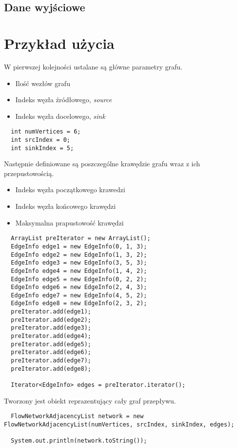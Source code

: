 \documentclass[10pt]{minutes}
\begin{document}
  \subsection{Dane wyjściowe}

\section{Przykład użycia}
W pierwszej kolejności ustalane są główne parametry grafu.
\begin{itemize}
\item Ilość wezłów grafu
\item Indeks węzła źródłowego, \emph{source}
\item Indeks węzła docelowego, \emph{sink}
\end{itemize}
\begin{lstlisting}        
  int numVertices = 6; 
  int srcIndex = 0; 
  int sinkIndex = 5;
\end{lstlisting}

Następnie definiowane są poszczególne krawędzie grafu wraz z ich przepustowością.
\begin{itemize}
\item Indeks węzła początkowego krawedzi
\item Indeks węzła końcowego krawędzi
\item Maksymalna prapustowość krawędzi
\end{itemize}
\begin{lstlisting}
  ArrayList preIterator = new ArrayList();
  EdgeInfo edge1 = new EdgeInfo(0, 1, 3);
  EdgeInfo edge2 = new EdgeInfo(1, 3, 2);
  EdgeInfo edge3 = new EdgeInfo(3, 5, 3);
  EdgeInfo edge4 = new EdgeInfo(1, 4, 2);
  EdgeInfo edge5 = new EdgeInfo(0, 2, 2);
  EdgeInfo edge6 = new EdgeInfo(2, 4, 3);
  EdgeInfo edge7 = new EdgeInfo(4, 5, 2);
  EdgeInfo edge8 = new EdgeInfo(2, 3, 2);
  preIterator.add(edge1);
  preIterator.add(edge2);
  preIterator.add(edge3);
  preIterator.add(edge4);
  preIterator.add(edge5);
  preIterator.add(edge6);
  preIterator.add(edge7);
  preIterator.add(edge8);
                               
  Iterator<EdgeInfo> edges = preIterator.iterator();  
\end{lstlisting}
 
Tworzony jest obiekt reprazentujący cały graf przepływu.
\begin{lstlisting}      
  FlowNetworkAdjacencyList network = new FlowNetworkAdjacencyList(numVertices, srcIndex, sinkIndex, edges);  
        
  System.out.println(network.toString());
\end{lstlisting}
\end{document}
